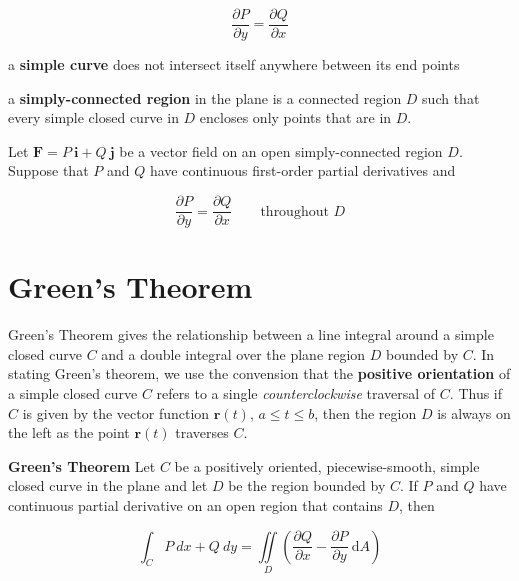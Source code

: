 \documentclass{article}
\begin{document}
\begin{equation*}
    \frac{\partial P}{\partial y} = \frac{\partial Q}{\partial x}
\end{equation*}

a \textbf{simple curve} does not intersect itself anywhere between its end points

a \textbf{simply-connected region} in the plane is a connected region $D$  such that every simple closed curve in $D$ encloses only points that are in $D$.

\begin{center}
    Let $\mathbf{F} = P \ \mathbf{i} + Q \ \mathbf{j}$ be a vector field on an open simply-connected region $D$. Suppose that $P$ and $Q$ have continuous first-order partial derivatives and 

    \begin{equation*}
        \frac{\partial P}{ \partial y} = \frac{\partial Q}{ \partial x} \qquad \text{throughout } D 
    \end{equation*}
\end{center}


\newpage
\section{Green's Theorem}

Green's Theorem gives the relationship between a line integral around a simple closed curve $C$ and a double integral over the plane region $D$ bounded by $C$. In stating Green's theorem, we use the convension that the \textbf{positive orientation} of a simple closed curve $C$ refers to a single \textit{counterclockwise} traversal of $C$. Thus if $C$ is given by the vector function $\mathbf{r}(t)$, $a \leq t \leq b$, then the region $D$ is always on the left as the point $\mathbf{r}(t)$ traverses $C$.
\\

\begin{center}
    \textbf{Green's Theorem} Let $C$ be a positively oriented, piecewise-smooth, simple closed curve in the plane and let $D$ be the region bounded by $C$. If $P$ and $Q$ have continuous partial derivative on an open region that contains $D$, then 

    \begin{equation*}
        \int_C P \ dx + Q \ dy = \iint\limits_{D} (\frac{\partial Q}{\partial x} - \frac{\partial P}{\partial y} \ \mathrm{d}A)
    \end{equation*}
\end{center}
\end{document}
